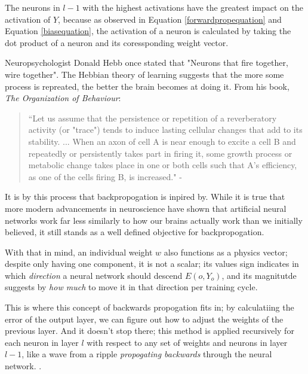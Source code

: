 \documentclass[12pt]{article}
\begin{document}
        The neurons in $l - 1$ with the highest activations have the greatest impact on the activation of $Y$, because as observed in Equation \ref{forwardpropequation} and Equation \ref{biasequation}, the activation of a neuron is calculated by taking the dot product of a neuron and its coressponding weight vector.

        Neuropsychologist Donald Hebb once stated that "Neurons that fire together, wire together". The Hebbian theory of learning suggests that the more some process is repreated, the better the brain becomes at doing it. From his book, \textit{The Organization of Behaviour}:

        \begin{quote}
            ``Let us assume that the persistence or repetition of a reverberatory activity (or "trace") tends to induce lasting cellular changes that add to its stability. ... When an axon of cell A is near enough to excite a cell B and repeatedly or persistently takes part in firing it, some growth process or metabolic change takes place in one or both cells such that A's efficiency, as one of the cells firing B, is increased." - \textcite{Hebb1949}
        \end{quote}

        It is by this process that backpropogation is inpired by. While it is true that more modern advancements in neuroscience have shown that artificial neural networks work far less similarly to how our brains actually work than we initially believed, it still stands as a well defined objective for backpropogation.

        With that in mind, an individual weight $w$ also functions as a physics vector; despite only having one component, it is not a scalar; its values sign indicates in which \textit{direction} a neural network should descend $E(o, Y_o)$, and its magnitutde suggests by \textit{how much} to move it in that direction per training cycle.

        This is where this concept of backwards propogation fits in; by calculatiing the error of the output layer, we can figure out how to adjust the weights of the previous layer. And it doesn't stop there; this method is applied recursively for each neuron in layer $l$ with respect to any set of weights and neurons in layer $l - 1$, like a wave from a ripple \textit{propogating backwards} through the neural network. \textcite{Nielsen2015}.

\end{document}
